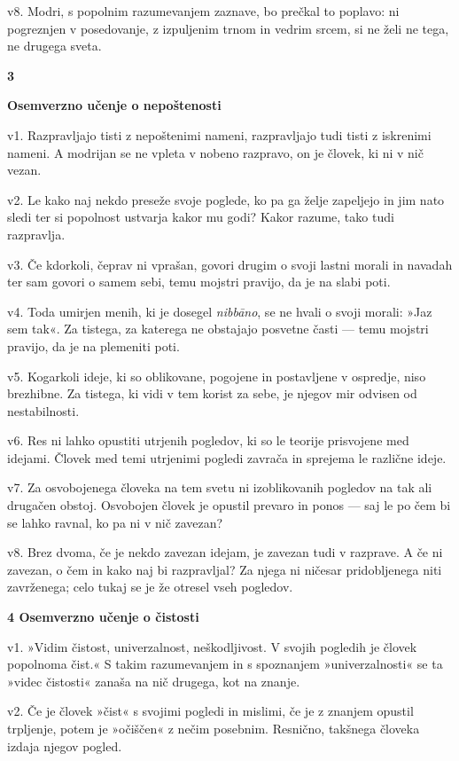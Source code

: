 v8. Modri, s popolnim razumevanjem zaznave, bo prečkal to poplavo: ni pogreznjen v posedovanje, z izpuljenim trnom in vedrim srcem, si ne želi ne tega, ne drugega sveta.

\textbf{3 }

\textbf{Osemverzno učenje o nepoštenosti }

v1. Razpravljajo tisti z nepoštenimi nameni, razpravljajo tudi tisti z iskrenimi nameni. A modrijan se ne vpleta v nobeno razpravo, on je človek, ki ni v nič vezan.

v2. Le kako naj nekdo preseže svoje poglede, ko pa ga želje zapeljejo in jim nato sledi ter si popolnost ustvarja kakor mu godi? Kakor razume, tako tudi razpravlja.

v3. Če kdorkoli, čeprav ni vprašan, govori drugim o svoji lastni morali in navadah ter sam govori o samem sebi, temu mojstri pravijo, da je na slabi poti.

v4. Toda umirjen menih, ki je dosegel \emph{nibbāno}, se ne hvali o svoji morali: »Jaz sem tak«. Za tistega, za katerega ne obstajajo posvetne časti --- temu mojstri pravijo, da je na plemeniti poti.

v5. Kogarkoli ideje, ki so oblikovane, pogojene in postavljene v ospredje, niso brezhibne. Za tistega, ki vidi v tem korist za sebe, je njegov mir odvisen od nestabilnosti.

v6. Res ni lahko opustiti utrjenih pogledov, ki so le teorije prisvojene med idejami. Človek med temi utrjenimi pogledi zavrača in sprejema le različne ideje.

v7. Za osvobojenega človeka na tem svetu ni izoblikovanih pogledov na tak ali drugačen obstoj. Osvobojen človek je opustil prevaro in ponos --- saj le po čem bi se lahko ravnal, ko pa ni v nič zavezan?

v8. Brez dvoma, če je nekdo zavezan idejam, je zavezan tudi v razprave. A če ni zavezan, o čem in kako naj bi razpravljal? Za njega ni ničesar pridobljenega niti zavrženega; celo tukaj se je že otresel vseh pogledov.

\textbf{4 Osemverzno učenje o čistosti}

v1. »Vidim čistost, univerzalnost, neškodljivost. V svojih pogledih je človek popolnoma čist.« S takim razumevanjem in s spoznanjem »univerzalnosti« se ta »videc čistosti« zanaša na nič drugega, kot na znanje.

v2. Če je človek »čist« s svojimi pogledi in mislimi, če je z znanjem opustil trpljenje, potem je »očiščen« z nečim posebnim. Resnično, takšnega človeka izdaja njegov pogled.

